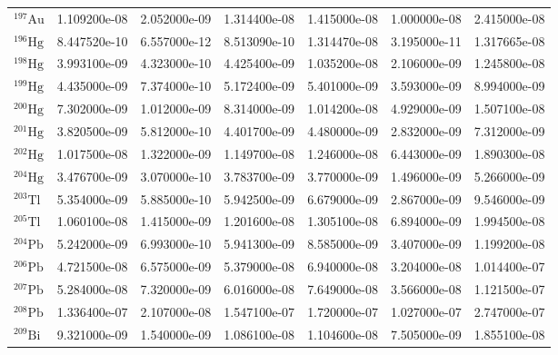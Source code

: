 \begin{tabular}{lrrrrrr}
$^{197}\mathrm{Au}$ &       1.109200e-08 &      2.052000e-09 &      1.314400e-08 &       1.415000e-08 &      1.000000e-08 &      2.415000e-08 \\
$^{196}\mathrm{Hg}$ &       8.447520e-10 &      6.557000e-12 &      8.513090e-10 &       1.314470e-08 &      3.195000e-11 &      1.317665e-08 \\
$^{198}\mathrm{Hg}$ &       3.993100e-09 &      4.323000e-10 &      4.425400e-09 &       1.035200e-08 &      2.106000e-09 &      1.245800e-08 \\
$^{199}\mathrm{Hg}$ &       4.435000e-09 &      7.374000e-10 &      5.172400e-09 &       5.401000e-09 &      3.593000e-09 &      8.994000e-09 \\
$^{200}\mathrm{Hg}$ &       7.302000e-09 &      1.012000e-09 &      8.314000e-09 &       1.014200e-08 &      4.929000e-09 &      1.507100e-08 \\
$^{201}\mathrm{Hg}$ &       3.820500e-09 &      5.812000e-10 &      4.401700e-09 &       4.480000e-09 &      2.832000e-09 &      7.312000e-09 \\
$^{202}\mathrm{Hg}$ &       1.017500e-08 &      1.322000e-09 &      1.149700e-08 &       1.246000e-08 &      6.443000e-09 &      1.890300e-08 \\
$^{204}\mathrm{Hg}$ &       3.476700e-09 &      3.070000e-10 &      3.783700e-09 &       3.770000e-09 &      1.496000e-09 &      5.266000e-09 \\
$^{203}\mathrm{Tl}$ &       5.354000e-09 &      5.885000e-10 &      5.942500e-09 &       6.679000e-09 &      2.867000e-09 &      9.546000e-09 \\
$^{205}\mathrm{Tl}$ &       1.060100e-08 &      1.415000e-09 &      1.201600e-08 &       1.305100e-08 &      6.894000e-09 &      1.994500e-08 \\
$^{204}\mathrm{Pb}$ &       5.242000e-09 &      6.993000e-10 &      5.941300e-09 &       8.585000e-09 &      3.407000e-09 &      1.199200e-08 \\
$^{206}\mathrm{Pb}$ &       4.721500e-08 &      6.575000e-09 &      5.379000e-08 &       6.940000e-08 &      3.204000e-08 &      1.014400e-07 \\
$^{207}\mathrm{Pb}$ &       5.284000e-08 &      7.320000e-09 &      6.016000e-08 &       7.649000e-08 &      3.566000e-08 &      1.121500e-07 \\
$^{208}\mathrm{Pb}$ &       1.336400e-07 &      2.107000e-08 &      1.547100e-07 &       1.720000e-07 &      1.027000e-07 &      2.747000e-07 \\
$^{209}\mathrm{Bi}$ &       9.321000e-09 &      1.540000e-09 &      1.086100e-08 &       1.104600e-08 &      7.505000e-09 &      1.855100e-08 \\

\end{tabular}
